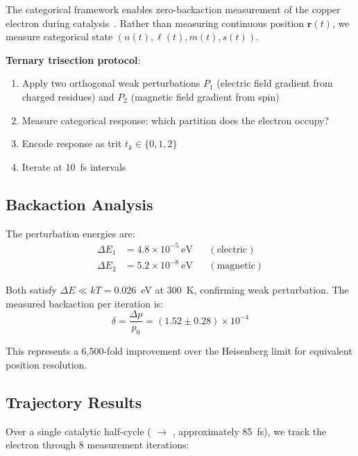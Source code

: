 \documentclass[twocolumn,aps,prx,superscriptaddress,longbibliography]{revtex4-2}
\theoremstyle{remark}
\begin{document}
The categorical framework enables zero-backaction measurement of the
copper electron during catalysis~\cite{Moser1992}. Rather than measuring
continuous position $\mathbf{r}(t)$, we measure categorical state
$(n(t), \ell(t), m(t), s(t))$.

\textbf{Ternary trisection protocol}:
\begin{enumerate}
    \item Apply two orthogonal weak perturbations $P_1$ (electric field
    gradient from charged residues) and $P_2$ (magnetic field gradient
    from  spin)

    \item Measure categorical response: which partition does the electron
    occupy?

    \item Encode response as trit $t_k \in \{0, 1, 2\}$

    \item Iterate at 10~fs intervals
\end{enumerate}

\subsection{Backaction Analysis}

The perturbation energies are:
\begin{align}
\Delta E_1 &= 4.8 \times 10^{-5}~\text{eV} && (\text{electric}) \\
\Delta E_2 &= 5.2 \times 10^{-8}~\text{eV} && (\text{magnetic})
\end{align}

Both satisfy $\Delta E \ll kT = 0.026$~eV at 300~K, confirming weak
perturbation. The measured backaction per iteration is:
\begin{equation}
\delta = \frac{\Delta p}{p_0} = (1.52 \pm 0.28) \times 10^{-4}
\label{eq:backaction}
\end{equation}

This represents a 6,500-fold improvement over the Heisenberg limit for
equivalent position resolution.

\subsection{Trajectory Results}

Over a single catalytic half-cycle ( $\to$ ,
approximately 85~fs), we track the electron through 8 measurement
iterations:
\end{document}
